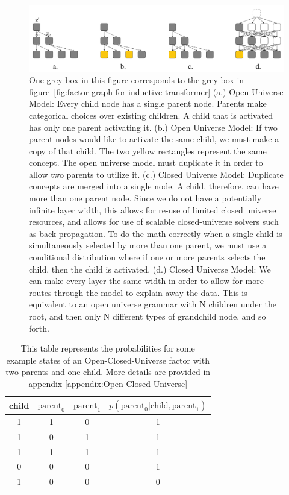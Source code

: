 \documentclass{article}
\begin{document}
\begin{figure}[H]
    \centering
    \includegraphics[width=\textwidth]{figures/from-open-universe-to-closed-universe.pdf}
    \caption{One grey box in this figure corresponds to the grey box in figure~\ref{fig:factor-graph-for-inductive-transformer} (a.) Open Universe Model: Every child node has a single parent node.  Parents make categorical choices over existing children.  A child that is activated has only one parent activating it. (b.) Open Universe Model: If two parent nodes would like to activate the same child, we must make a copy of that child.  The two yellow rectangles represent the same concept.  The open universe model must duplicate it in order to allow two parents to utilize it.  (c.) Closed Universe Model: Duplicate concepts are merged into a single node.  A child, therefore, can have more than one parent node.  Since we do not have a potentially infinite layer width, this allows for re-use of limited closed universe resources, and allows for use of scalable closed-universe solvers such as back-propagation.  To do the math correctly when a single child is simultaneously selected by more than one parent, we must use a conditional distribution where if one or more parents selects the child, then the child is activated. (d.) Closed Universe Model: We can make every layer the same width in order to allow for more routes through the model to explain away the data.  This is equivalent to an open universe grammar with N children under the root, and then only N different types of grandchild node, and so forth.}
    \label{fig-appendix:from-open-universe-to-closed-universe}
\end{figure}

\begin{table}[H]
    \setlength{\extrarowheight}{5pt}
    \centering
    \begin{tabular}{c|c|c|c}
        \hline\hline
        child & $\text{parent}_0$ & $\text{parent}_1$ & $p(\text{parent}_0|\text{child}, \text{parent}_1)$ \\[1ex]
        \hline
        1    & 1          & 0          & 1 \\
        1    & 0          & 1          & 1 \\
        1    & 1          & 1          & 1 \\
        0    & 0          & 0          & 1 \\
        1    & 0          & 0          & 0 \\[1ex]
        \hline
    \end{tabular}
    \caption{This table represents the probabilities for some example states of an Open-Closed-Universe factor with two parents and one child.  More details are provided in appendix \ref{appendix:Open-Closed-Universe}}
    \label{tab:open-universe-encoder}
\end{table}
\end{document}

